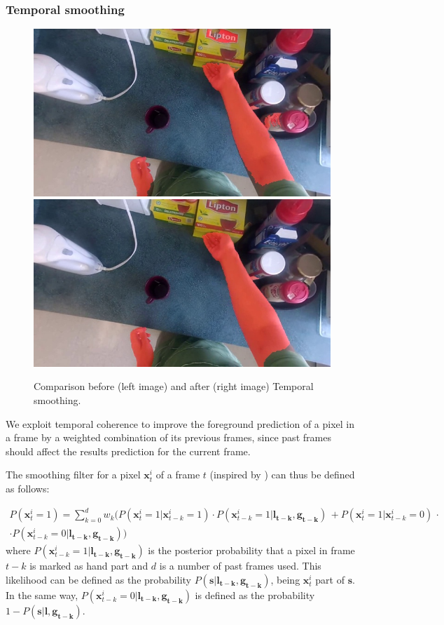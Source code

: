 \subsubsection{Temporal smoothing}
\begin{figure}[tb]
\centering
\includegraphics[width=.45\columnwidth]{./Figures/context-free2.jpg}
\includegraphics[width=.45\columnwidth]{./Figures/context-dependent2.jpg}
\caption{Comparison before (left image) and after (right image) Temporal smoothing.}
\label{fig:gesture_samples_time}
\end{figure}
We exploit temporal coherence to improve the foreground prediction of a pixel in a frame by a weighted combination of
its previous frames, since past frames should affect the results prediction for the current frame.

The smoothing filter for a pixel $\mathbf{x}_{t}^{i}$ of a frame $t$ (inspired by \cite{liu08}) can thus be defined as follows:

\begin{multline}
P(\mathbf{x}_{t}^{i}=1) = \sum_{k = 0}^{d} w_{k} \bigl( P(\mathbf{x}_{t}^{i}=1|\mathbf{x}_{t-k}^{i}=1) \cdot P(\mathbf{x}_{t-k}^{i}=1|\mathbf{l_{t-k}},\mathbf{g_{t-k}})\, + P(\mathbf{x}_{t}^{i}=1|\mathbf{x}_{t-k}^{i}=0) \, \cdot \\
\cdot P(\mathbf{x}_{t-k}^{i}=0|\mathbf{l_{t-k}},\mathbf{g_{t-k}}) \bigr)
\end{multline}
where $P(\mathbf{x}_{t-k}^{i}=1|\mathbf{l_{t-k}},\mathbf{g_{t-k}})$ is the posterior probability
that a pixel in frame $t-k$ is marked as hand part and $d$ is a number of past frames used. This likelihood can be defined as the probability $P(\mathbf{s}|\mathbf{l_{t-k}},\mathbf{g_{t-k}})$, being
$\mathbf{x}_{t}^{i}$ part of $\mathbf{s}$. In the same way, $P(\mathbf{x}_{t-k}^{i}=0|\mathbf{l_{t-k}},\mathbf{g_{t-k}})$ is defined as the probability
$1-P(\mathbf{s}|\mathbf{l},\mathbf{g_{t-k}})$. 

